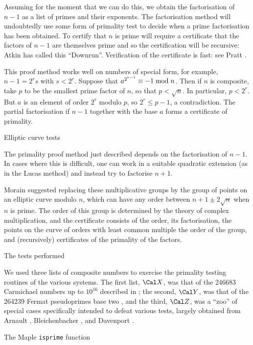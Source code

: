 Assuming for the moment that we can do this, we obtain the factorisation of $n-1$
as a list of primes and their exponents.  The factorisation method will undoubtedly
use some form of primality test to decide when a prime factorisation has been obtained.
To certify that $n$ is prime will require a certificate that the factors of $n-1$
are themselves prime and so the certification will be recursive: Atkin has called
this ``Downrun''.  Verification of the certificate is fast: see Pratt \cite{38}.

This proof method works well on numbers of special form, for example,
$n-1 = 2^r s$ with $s < 2^r$.  Suppose that $a^{2^{r-1}} \equiv -1 \bmod n$.
Then if $n$ is composite, take $p$ to be the smallest prime factor of $n$, so that
$p < \sqrt{n}$.  In particular, $p < 2^r$.  But $a$ is an element of order $2^r$ modulo
$p$, so $2^r \le p-1$, a contradiction.  The partial factorisation if $n-1$ 
together with the base $a$ forms a certificate of primality.


\subhead Elliptic curve tests \endsubhead

The primality proof method just described depends on the factorisation of
$n-1$.  In cases where this is difficult, one can work in a suitable quadratic
extension (as in the Lucas method) and instead try to factorise $n+1$.  

Morain \cite{6,29} suggested replacing these multiplicative groups by the 
group of points on
an elliptic curve modulo $n$, which can have any order between $n+1 \pm 2\sqrt{n}$
when $n$ is prime.  The order of this group is determined by the theory of
complex multiplication, and the certificate consists of the order, its factorisation,
the points on the curve of orders with least common multiple the order of the group,
and (recursively) certificates of the primality of the factors.


\subhead The tests performed \endsubhead

We used three lists of composite numbers
to exercise the primality testing routines of the various systems.
The first list, $\sX$, was that of the 246683 Carmichael numbers up to $10^{16}$
described in \cite{30,31};
the second, $\sY$, was that of the 264239 Fermat pseudoprimes base two \cite{32,33},
and the third, $\sZ$, was a
``zoo'' of special cases specifically intended to defeat various tests, 
largely obtained from Arnault \cite{3,4,5}, Bleichenbacher \cite{9,10},
and Davenport \cite{20}.


\subhead The Maple {\tt isprime} function \endsubhead

